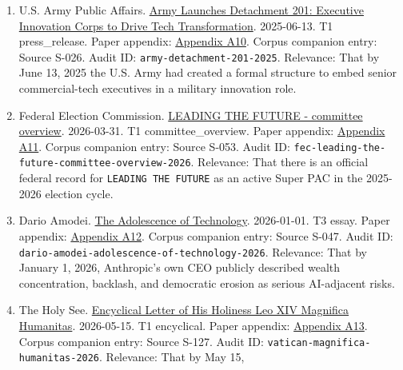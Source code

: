 \documentclass[
  american,
  11pt,
  letterpaper,
]{article}
\begin{document}
\begin{enumerate}
{  A9}. Corpus companion entry: Source S-098. Audit ID:
  \texttt{palantir-anthropic-aws-gov-partnership-2024}. Relevance: That
  by November 7, 2024 Anthropic model access for U.S. intelligence and
  defense agencies was being publicly distributed through a
  Palantir-plus-AWS stack.
\item
  U.S. Army Public Affairs.
  \href{https://www.army.mil/article/286317/army_launches_detachment_201_executive_innovation_corps_to_drive_tech_transformation}{Army
  Launches Detachment 201: Executive Innovation Corps to Drive Tech
  Transformation}. 2025-06-13. T1 press\_release. Paper appendix:
  \hyperref[appendix-a10-army-launches-detachment-201-executive-innovation-corps-to-drive-tech-transformation]{Appendix
  A10}. Corpus companion entry: Source S-026. Audit ID:
  \texttt{army-detachment-201-2025}. Relevance: That by June 13, 2025
  the U.S. Army had created a formal structure to embed senior
  commercial-tech executives in a military innovation role.
\item
  Federal Election Commission.
  \href{https://www.fec.gov/data/committee/C00916114/}{LEADING THE
  FUTURE - committee overview}. 2026-03-31. T1 committee\_overview.
  Paper appendix:
  \hyperref[appendix-a11-leading-the-future-committee-overview]{Appendix
  A11}. Corpus companion entry: Source S-053. Audit ID:
  \texttt{fec-leading-the-future-committee-overview-2026}. Relevance:
  That there is an official federal record for
  \texttt{LEADING\ THE\ FUTURE} as an active Super PAC in the 2025-2026
  election cycle.
\item
  Dario Amodei.
  \href{https://darioamodei.com/essay/the-adolescence-of-technology}{The
  Adolescence of Technology}. 2026-01-01. T3 essay. Paper appendix:
  \hyperref[appendix-a12-the-adolescence-of-technology]{Appendix A12}.
  Corpus companion entry: Source S-047. Audit ID:
  \texttt{dario-amodei-adolescence-of-technology-2026}. Relevance: That
  by January 1, 2026, Anthropic's own CEO publicly described wealth
  concentration, backlash, and democratic erosion as serious AI-adjacent
  risks.
\item
  The Holy See.
  \href{https://www.vatican.va/content/leo-xiv/en/encyclicals/documents/20260515-magnifica-humanitas.html}{Encyclical
  Letter of His Holiness Leo XIV Magnifica Humanitas}. 2026-05-15. T1
  encyclical. Paper appendix:
  \hyperref[appendix-a13-encyclical-letter-of-his-holiness-leo-xiv-magnifica-humanitas]{Appendix
  A13}. Corpus companion entry: Source S-127. Audit ID:
  \texttt{vatican-magnifica-humanitas-2026}. Relevance: That by May 15,

\end{enumerate}
\end{document}
